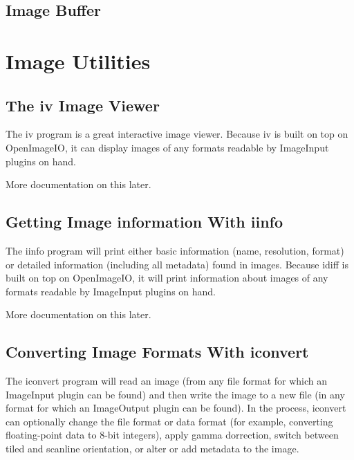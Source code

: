 \documentclass[11pt,letterpaper]{book}
\def\product{{\sffamily OpenImageIO}\xspace}
\def\ImageInput{{\codefont ImageInput}\xspace}
\def\ImageOutput{{\codefont ImageOutput}\xspace}
\begin{document}
\chapter{Image Buffer}



\part{Image Utilities}

\chapter{The {\kw iv} Image Viewer}

The {\cf iv} program is a great interactive image viewer.  Because {\cf
  iv} is built on top on \product, it can display images of any formats
readable by \ImageInput plugins on hand.

\medskip

More documentation on this later.


\chapter{Getting Image information With {\kw iinfo}}

The {\cf iinfo} program will print either basic information (name,
resolution, format) or detailed information (including all metadata)
found in images.  Because {\cf idiff} is built on top on \product, it
will print information about images of any formats readable by
\ImageInput plugins on hand.

\medskip

More documentation on this later.


\chapter{Converting Image Formats With {\kw iconvert}}

The {\cf iconvert} program will read an image (from any file format for
which an \ImageInput plugin can be found) and then write the image to a
new file (in any format for which an \ImageOutput plugin can be found).
In the process, {\cf iconvert} can optionally change the file format or
data format (for example, converting floating-point data to 8-bit
integers), apply gamma dorrection, switch between tiled and scanline
orientation, or alter or add metadata to the image.

\medskip
\end{document}
